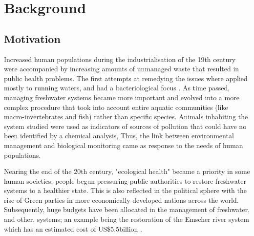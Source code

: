 
\chapter{Background}  %

\ifpdf
    \graphicspath{{Chapter1/Figs/Raster/}{Chapter1/Figs/PDF/}{Chapter1/Figs/}}
\else
    \graphicspath{{Chapter1/Figs/Vector/}{Chapter1/Figs/}}
\fi


\section{Motivation}



Increased human populations during the industrialisation of the 19th century were accompanied by increasing amounts of unmanaged waste that resulted in public health problems. The first attempts at remedying the issues where applied mostly to running waters, and had a bacteriological focus \cite{AQUATIC_INSECTS_BIOMONITORING}. As time passed, managing freshwater systems became more important and evolved into a more complex procedure that took into account entire aquatic communities (like macro-invertebrates and fish) rather than specific species. Animals inhabiting the system studied were used as indicators of sources of pollution that could have no been identified by a chemical analysis, Thus, the link between environmental management and biological monitoring came as response to the needs of human populations.



Nearing the end of the 20th century, "ecological health" became a priority in some human societies; people begun pressuring public authorities to restore freshwater systems to a healthier state. This is also reflected in the political sphere with the rise of Green parties in more economically developed nations across the world. Subsequently, huge budgets have been allocated in the management of freshwater, and other, systems; an example being the restoration of the Emscher river system which has an estimated cost of US\$5.5billion \cite{emscher}. 


